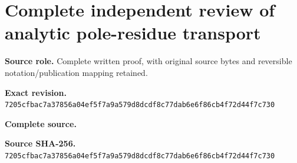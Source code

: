 \begingroup
\sloppy
\small
\section{Complete independent review of analytic pole-residue transport}
\noindent\textbf{Source role.} Complete written proof, with original source bytes and reversible notation/publication mapping retained.\par
\noindent\textbf{Exact revision.} \nolinkurl{7205cfbac7a37856a04ef5f7a9a579d8dcdf8c77dab6e6f86cb4f72d44f7c730}\par
\noindent\textbf{Complete source.} \par
\noindent\textbf{Source SHA-256.} \nolinkurl{7205cfbac7a37856a04ef5f7a9a579d8dcdf8c77dab6e6f86cb4f72d44f7c730}\par\medskip

\endgroup

